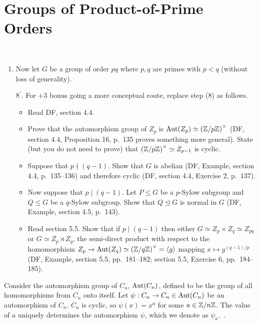 \section{Groups of Product-of-Prime Orders}~\label{sec:main-theorem}

\begin{Answer}
  \begin{enumerate}
    \item Now let $G$ be a group of order $pq$ where $p,q$ are primes with $p < q$ 
    (without loss of generality).
    \item[{8${}^\prime$.}] For +3 bonus going a more conceptual route, replace step 
    (8) as follows.
    \begin{itemize}
    \item Read DF, section 4.4.  
    \item Prove that the automorphism group of $Z_p$ is $\operatorname{Aut}(Z_p) \simeq
      {(\mathbb{Z}/p\mathbb{Z})}^\times$ (DF, section 4.4, Proposition 16, p.~135 proves something more general).  
    State (but you do not need to prove) that ${(\mathbb{Z}/p\mathbb{Z})}^\times \simeq Z_{p-1}$ is 
    cyclic.  
    \item Suppose that $p \nmid (q-1)$.  Show that $G$ is abelian (DF, Example, section
    4.4, p.~135--136)
    and therefore cyclic (DF, section 4.4, Exercise 2, p.~137).  
    \item Now suppose that $p \mid (q-1)$.  Let $P \leq G$ be a $p$-Sylow subgroup and 
    $Q \leq G$ be a $q$-Sylow subgroup.  Show that $Q \trianglelefteq G$ is normal in 
    $G$ (DF, Example, section 4.5, p.~143).
    \item Read section 5.5.  Show that if $p \mid (q-1)$ then either $G \simeq Z_p
    \times Z_q \simeq Z_{pq}$ or $G \simeq Z_p \rtimes Z_q$, the semi-direct product 
    with respect to the homomorphism $Z_p \to \operatorname{Aut}(Z_q) \simeq {(\mathbb{Z}/q\mathbb{Z})}^\times =
    \langle g \rangle$ mapping $x \mapsto g^{(q-1)/p}$ (DF, Example, section 5.5, 
    pp.~181--182; section 5.5, Exercise 6, pp.~184--185).
    \end{itemize}
  \end{enumerate}
\end{Answer}

Consider the automorphism group of $C_n$, $\operatorname{Aut}(C_n)$,
defined to be the group of all homomorphisms from $C_n$ onto itself.
Let $\psi : C_n \to C_n \in \operatorname{Aut}(C_n)$ be an automorphism of $C_n$.
$C_n$ is cyclic, so $\psi(x) = x^a$ for some $a \in \mathbb{Z}/n\mathbb{Z}$.
The value of $a$ uniquely determines the automorphism $\psi$,
which we denote as $\psi_a$.~\cite[see DF Section 4.4, Proposition $16$]{DummitFoote}.



